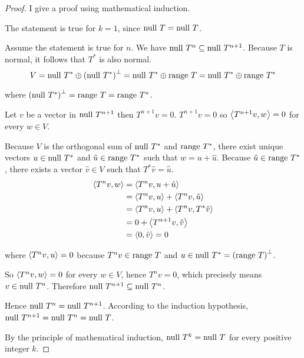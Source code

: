 \begin{proof}
    I give a proof using mathematical induction.

    The statement is true for $k = 1$, since $\operatorname{null}\,{T} = \operatorname{null}\,{T}$.

    Assume the statement is true for $n$. We have $\operatorname{null}\,{T^{n}}\subseteq\operatorname{null}\,{T^{n+1}}$. Because $T$ is normal, it follows that $T^{*}$ is also normal.
    \[
        V = \operatorname{null}\,{T^{*}}\oplus{(\operatorname{null}\,{T^{*}})}^{\bot} = \operatorname{null}\,{T^{*}}\oplus\operatorname{range}\,{T} = \operatorname{null}\,{T^{*}}\oplus\operatorname{range}\,{T^{*}}
    \]

    where ${(\operatorname{null}\,{T^{*}})}^{\bot} = \operatorname{range}\,{T} = \operatorname{range}\,{T^{*}}$.

    Let $v$ be a vector in $\operatorname{null}\,{T^{n+1}}$ then $T^{n+1}v = 0$. $T^{n+1}v = 0$ so $\left\langle{T^{n+1}v, w}\right\rangle = 0$ for every $w\in V$.

    Because $V$ is the orthogonal sum of $\operatorname{null}\,{T^{*}}$ and $\operatorname{range}\,{T^{*}}$, there exist unique vectors $u\in \operatorname{null}\,{T^{*}}$ and $\hat{u}\in\operatorname{range}\,{T^{*}}$ such that $w = u + \hat{u}$. Because $\hat{u}\in \operatorname{range}\,{T^{*}}$, there exists a vector $\hat{v}\in V$ such that $T^{*}\hat{v} = \hat{u}$.
    \begin{align*}
        \left\langle{T^{n}v, w}\right\rangle & = \left\langle{T^{n}v, u + \hat{u}}\right\rangle                          \\
                              & = \left\langle{T^{n}v, u}\right\rangle + \left\langle{T^{n}v, \hat{u}}\right\rangle      \\
                              & = \left\langle{T^{n}v, u}\right\rangle + \left\langle{T^{n}v, T^{*}\hat{v}}\right\rangle \\
                              & = 0 + \left\langle{T^{n+1}v, \hat{v}}\right\rangle                        \\
                              & = \left\langle{0, \hat{v}}\right\rangle = 0
    \end{align*}

    where $\left\langle{T^{n}v, u}\right\rangle = 0$ because $T^{n}v\in\operatorname{range}\,{T}$ and $u\in\operatorname{null}\,{T^{*}} = {(\operatorname{range}\,{T})}^{\bot}$.

    So $\left\langle{T^{n}v, w}\right\rangle = 0$ for every $w\in V$, hence $T^{n}v = 0$, which precisely means $v\in\operatorname{null}\,{T^{n}}$. Therefore $\operatorname{null}\,{T^{n+1}}\subseteq \operatorname{null}\,{T^{n}}$.

    Hence $\operatorname{null}\,{T^{n}} = \operatorname{null}\,{T^{n+1}}$. According to the induction hypothesis, $\operatorname{null}\,{T^{n+1}} = \operatorname{null}\,{T^{n}} = \operatorname{null}\,{T}$.

    By the principle of mathematical induction, $\operatorname{null}\,{T^{k}} = \operatorname{null}\,{T}$ for every positive integer $k$.


\end{proof}
